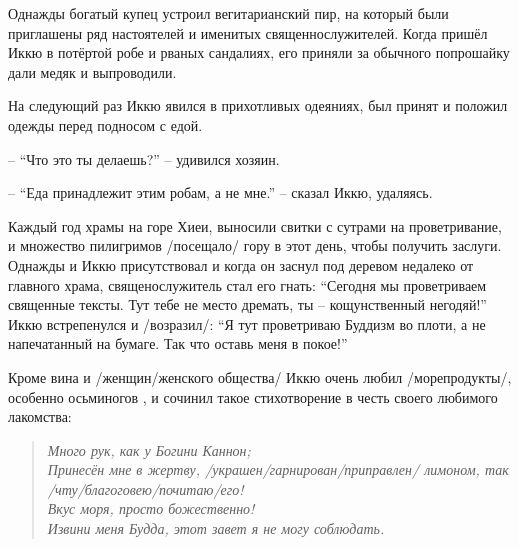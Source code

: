 \begin{ver}
Однажды богатый купец устроил вегитарианский пир, на который были
приглашены ряд настоятелей и именитых священнослужителей.
Когда пришёл Иккю в потёртой робе и рваных сандалиях, его приняли за
обычного попрошайку дали медяк и выпроводили.

На следующий раз Иккю явился в прихотливых одеяниях, был принят и
положил одежды перед подносом с едой.

-- ``Что это ты делаешь?'' -- удивился хозяин.

-- ``Еда принадлежит этим робам, а не мне.'' -- сказал Иккю, удаляясь.
\end{ver}

\begin{ver}
  Каждый год храмы на горе Хиеи, выносили свитки с сутрами на
  проветривание, и множество пилигримов /посещало/ гору в этот день,
  чтобы получить заслуги. Однажды и Иккю присутствовал и когда он заснул под
  деревом недалеко от главного храма, священослужитель стал его гнать:
  ``Сегодня мы проветриваем священные тексты. Тут тебе не место
  дремать, ты -- кощунственный негодяй!'' Иккю встрепенулся и
  /возразил/: ``Я тут проветриваю Буддизм во плоти, а не напечатанный
  на бумаге. Так что оставь меня в покое!''  
\end{ver}

\begin{ver}
  Кроме вина и /женщин/женского общества/ Иккю очень любил
  /морепродукты/, особенно осьминогов , и сочинил такое стихотворение в
  честь своего любимого лакомства:
\end{ver}

\begin{ver}
  \begin{verse}\it
  Много рук, как у Богини Каннон;\\
  Принесён мне в жертву, /украшен/гарнирован/приправлен/ лимоном, так
  /чту/благоговею/почитаю/его!\\
  Вкус моря, просто божественно!\\
  Извини меня Будда, этот завет я не могу соблюдать.
  \end{verse}
\end{ver}
